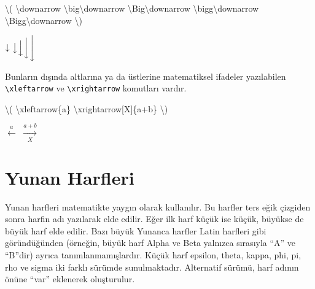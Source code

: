 \documentclass[
  10pt,
]{scrbook}
\newenvironment{Shaded}{}{}
\newcommand{\SpecialCharTok}[1]{\textcolor[rgb]{0.25,0.44,0.63}{#1}}
\newcommand{\SpecialStringTok}[1]{\textcolor[rgb]{0.73,0.40,0.53}{#1}}
\theoremstyle{definition}
\theoremstyle{definition}
\theoremstyle{definition}
\theoremstyle{definition}
\theoremstyle{remark}
\begin{document}
\begin{Shaded}
\begin{Highlighting}[]
\SpecialStringTok{\textbackslash{}(}
\SpecialCharTok{\textbackslash{}downarrow}
\SpecialCharTok{\textbackslash{}big\textbackslash{}downarrow}
\SpecialCharTok{\textbackslash{}Big\textbackslash{}downarrow}
\SpecialCharTok{\textbackslash{}bigg\textbackslash{}downarrow}
\SpecialCharTok{\textbackslash{}Bigg\textbackslash{}downarrow}
\SpecialStringTok{\textbackslash{})}
\end{Highlighting}
\end{Shaded}

\(\downarrow \big\downarrow \Big\downarrow \bigg\downarrow \Bigg\downarrow\)

Bunların dışında altlarına ya da üstlerine matematiksel ifadeler yazılabilen \texttt{\textbackslash{}xleftarrow} ve \texttt{\textbackslash{}xrightarrow} komutları vardır.

\begin{Shaded}
\begin{Highlighting}[]
\SpecialStringTok{\textbackslash{}(}
\SpecialCharTok{\textbackslash{}xleftarrow}\SpecialStringTok{\{a\}}
\SpecialCharTok{\textbackslash{}xrightarrow}\SpecialStringTok{[X]\{a+b\}}
\SpecialStringTok{\textbackslash{})}
\end{Highlighting}
\end{Shaded}

\(\xleftarrow{a}\) \(\xrightarrow[X]{a+b}\)

\hypertarget{yunan-harfleri}{%
\section{Yunan Harfleri}\label{yunan-harfleri}}

Yunan harfleri matematikte yaygın olarak kullanılır. Bu harfler ters eğik çizgiden sonra harfin adı yazılarak elde edilir. Eğer ilk harf küçük ise küçük, büyükse de büyük harf elde edilir. Bazı büyük Yunanca harfler Latin harfleri gibi göründüğünden (örneğin, büyük harf Alpha ve Beta yalnızca sırasıyla ``A'' ve ``B''dir) ayrıca tanımlanmamışlardır. Küçük harf epsilon, theta, kappa, phi, pi, rho ve sigma iki farklı sürümde sunulmaktadır. Alternatif sürümü, harf adının önüne ``var'' eklenerek oluşturulur.
\end{document}
